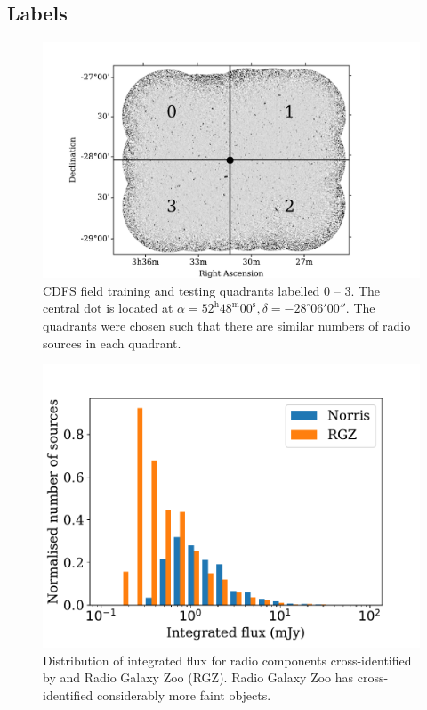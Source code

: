 \documentclass[fleqn,usenatbib,usedcolumn]{mnras}
\begin{document}
  \subsection{Labels}\label{labels}
    \begin{figure}
      \centering
      \includegraphics[width=\columnwidth]{images/quadrants.pdf}
      \caption{CDFS field training and testing quadrants labelled 0 -- 3. The
        central dot is located at $\alpha = 52^\text{h}48^\text{m}00^\text{s},
        \delta = -28^\circ{}06'00''$. The quadrants were chosen such that
        there are similar numbers of radio sources in each
        quadrant.\label{fig:quadrants}}
    \end{figure}

    \begin{figure}
      \centering
      \includegraphics[width=\columnwidth]{images/flux_histogram.pdf}
      \caption{Distribution of integrated flux for radio components
        cross-identified by \citet{norris06} and Radio Galaxy Zoo (RGZ). Radio
        Galaxy Zoo has cross-identified considerably more faint objects.}
    \end{figure}
\end{document}
